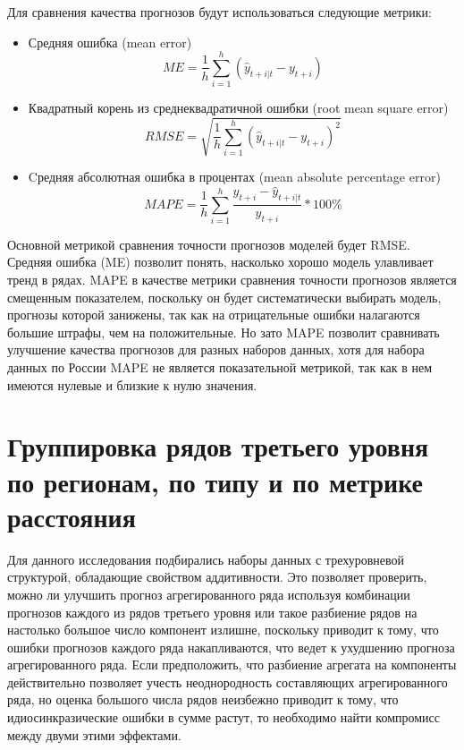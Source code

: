 \documentclass[12pt,a4paper, oneside]{extreport}
\begin{document}
Для сравнения качества прогнозов будут использоваться следующие метрики:

\begin{itemize}
	\item  Средняя ошибка (mean error)
\begin{equation}\label{key}
ME = \frac{1}{h} \sum_{i=1}^h(\hat{y}_{t+i|t}-y_{t+i}) 
\end{equation}
\item  Квадратный корень из среднеквадратичной ошибки (root mean square error)
\begin{equation}\label{key}
RMSE = \sqrt{  \frac{1}{h} \sum_{i=1}^h(\hat{y}_{t+i|t}-y_{t+i})^2} 
\end{equation}
\item  Cредняя абсолютная ошибка в процентах  (mean absolute percentage error)
\begin{equation}\label{key}
MAPE = \frac{1}{h} \sum_{i=1}^h \frac{y_{t+i} - \hat{y}_{t+i|t} }{y_{t+i}} * 100\%
\end{equation}

\end{itemize}

Основной метрикой сравнения точности прогнозов моделей будет  RMSE. Средняя ошибка (ME) позволит понять, насколько хорошо модель улавливает тренд в рядах.  MAPE в качестве метрики сравнения точности прогнозов является смещенным показателем, поскольку он будет систематически выбирать модель, прогнозы которой занижены, так как на отрицательные ошибки налагаются большие штрафы, чем на положительные. 
Но зато MAPE позволит сравнивать улучшение качества прогнозов для разных наборов данных, хотя  для набора данных по России MAPE не является показательной метрикой, так как в нем имеются нулевые и близкие к нулю значения.


\section{Группировка рядов третьего уровня по регионам, по типу и по метрике расстояния}

Для данного исследования подбирались наборы данных с трехуровневой структурой, обладающие свойством аддитивности. Это позволяет проверить,  можно ли улучшить прогноз агрегированного ряда используя  комбинации прогнозов каждого из рядов третьего уровня или такое  разбиение рядов на настолько большое число компонент излишне, поскольку приводит к тому, что ошибки прогнозов каждого ряда накапливаются, что ведет  к ухудшению прогноза агрегированного ряда. Если предположить, что разбиение агрегата на компоненты действительно позволяет учесть неоднородность составляющих агрегированного ряда, но оценка большого числа рядов неизбежно приводит к тому, что идиосинкразические    ошибки в сумме растут,     то необходимо найти компромисс между двуми этими эффектами. 
\end{document}
